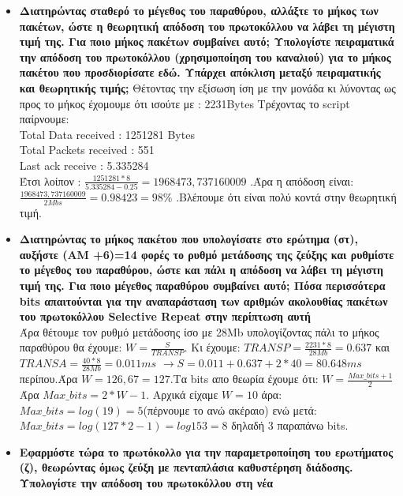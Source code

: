 \documentclass{article}
\begin{document}
\begin{itemize}
{			εξίσωση; Αν όχι, πού οφείλεται η απόκλιση; }. Ξαναυπολογίζοντας έχουμε: $W=10$, $TRANSP=\frac{1000*8}{2Mb}=4*10^{-3}$,$PROP=40ms$.$TRANSA = \frac{40*8}{2Mb}=0.16*10^{-3}$
		$S=TRANSA+TRANSP +2*PROP=84.16ms$ άρα $\frac{10*4ms}{84.16ms}=0,47529$.Η θεωρητική τιμή είναι μεγαλύτερη από την αυτη.Αυτό συμβαίνει εξαιτίας τις καθυστερήσεις μεταξύ λήψεις πακέτου κι αποστολείς επιβεβαιώσεις.
		\item \textbf{Διατηρώντας σταθερό το μέγεθος του παραθύρου, αλλάξτε το μήκος των πακέτων, ώστε η
			θεωρητική απόδοση του πρωτοκόλλου να λάβει τη μέγιστη τιμή της. Για ποιο μήκος πακέτων
			συμβαίνει αυτό; Υπολογίστε πειραματικά την απόδοση του πρωτοκόλλου (χρησιμοποίηση του
			καναλιού) για το μήκος πακέτου που προσδιορίσατε εδώ. Υπάρχει απόκλιση μεταξύ πειραματικής
			και θεωρητικής τιμής; }
		Θέτοντας την εξίσωση ίση με την μονάδα κι λύνοντας ως προς το μήκος έχομουμε ότι ισούτε με : 2231Bytes Τρέχοντας το script παίρνουμε:\\
		Total Data received	: 1251281 Bytes\\
		Total Packets received	: 551\\
		Last ack receive	: 5.335284\\
		Έτσι λοίπον : $\frac{1251281*8}{5.335284-0.25}=1968473,737160009$ .Άρα η απόδοση είναι: $\frac{1968473,737160009}{2Mbs}=0.98423=98\%$ .Βλέπουμε ότι είναι πολύ κοντά στην θεωρητική τιμή.
		\item \textbf{Διατηρώντας το μήκος πακέτου που υπολογίσατε στο ερώτημα (στ), αυξήστε (AM
			+6)=14 φορές το
			ρυθμό μετάδοσης της ζεύξης και ρυθμίστε το μέγεθος του παραθύρου, ώστε και πάλι η απόδοση να
			λάβει τη μέγιστη τιμή της. Για ποιο μέγεθος παραθύρου συμβαίνει αυτό; Πόσα περισσότερα bits
			απαιτούνται για την αναπαράσταση των αριθμών ακολουθίας πακέτων του πρωτοκόλλου Selective
			Repeat στην περίπτωση αυτή}\\Άρα θέτουμε τον ρυθμό μετάδοσης ίσο με 28Mb υπολογίζοντας πάλι το μήκος παραθύρου θα έχουμε:
			$W=\frac{S}{TRANSP}$. Κι έχουμε: $TRANSP = \frac{2231*8}{28Mb}=0.637$ και $TRANSA=\frac{40*8}{28Mb}=0.011ms$ $\rightarrow S=0.011 +0.637 +2*40=80.648ms$ περίπου.Άρα $W=126,67=127$.Τα bits απο θεωρία έχουμε ότι: $W=\frac{Max\_bits +1}{2}$Άρα $Max\_bits=2*W-1$. Αρχικά είχαμε $W=10$ άρα: $Max\_bits=log(19)=5$(πέρνουμε το ανώ ακέραιο) ενώ μετά: $Max\_bits=log(127*2-1)=log153=8$ δηλαδή 3 παραπάνω bits.
			\item \textbf{Εφαρμόστε τώρα το πρωτόκολλο για την παραμετροποίηση του ερωτήματος (ζ), θεωρώντας όμως
				ζεύξη με πενταπλάσια καθυστέρηση διάδοσης. Υπολογίστε την απόδοση του πρωτοκόλλου στη νέα
}
\end{itemize}
\end{document}
